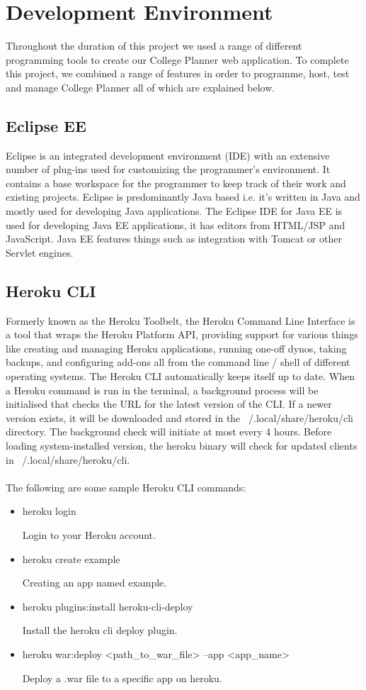 \section{Development Environment}
Throughout the duration of this project we used a range of different programming tools to create our College Planner web application. To complete this project, we combined a range of features in order to programme, host, test and manage College Planner all of which are explained below. 

\subsection{Eclipse EE}
Eclipse is an integrated development environment (IDE) with an extensive number of plug-ins used for customizing the programmer’s environment. It contains a base workspace for the programmer to keep track of their work and existing projects. Eclipse is predominantly Java based i.e. it's written in Java and mostly used for developing Java applications. The Eclipse IDE for Java EE is used for developing Java EE applications, it has editors from HTML/JSP and JavaScript. Java EE features things such as integration with Tomcat or other Servlet engines\cite{Eclipse}. 

\subsection{Heroku CLI}
Formerly known as the Heroku Toolbelt, the Heroku Command Line Interface is a tool that wraps the Heroku Platform API, providing support for various things like creating and managing Heroku applications, running one-off dynos, taking backups, and configuring add-ons all from the command line / shell of different operating systems. The Heroku CLI automatically keeps itself up to date. When a Heroku command is run in the terminal, a background process will be initialised that checks the URL for the latest version of the CLI\cite{HerokuCLI}. If a newer version exists, it will be downloaded and stored in the ~/.local/share/heroku/cli directory. The background check will initiate at most every 4 hours. Before loading system-installed version, the heroku binary will check for updated clients in ~/.local/share/heroku/cli.\\
\\
The following are some sample Heroku CLI commands:

\begin{itemize}
    \item heroku login\par
    Login to your Heroku account.
    \item heroku create example\par
    Creating an app named example.
    \item heroku plugins:install heroku-cli-deploy\par 
    Install the heroku cli deploy plugin.
    \item heroku war:deploy <path\_to\_war\_file> --app <app\_name>\par
    Deploy a .war file to a specific app on heroku.
\end{itemize}

